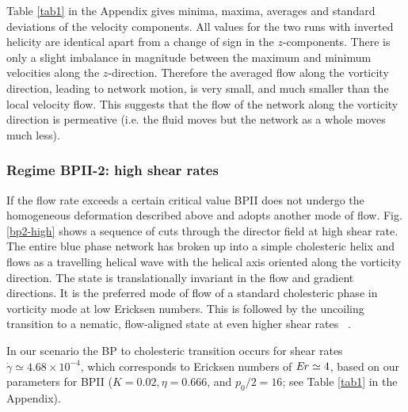 \documentclass[8.5pt,twoside,twocolumn]{article}
\newcommand{\e}[1]{\times10^{#1}}
\newcommand{\gd}{\dot{\gamma}}
\begin{document}
Table \ref{tab1} in the Appendix 
gives minima, maxima, averages and standard deviations 
of the velocity components.
All values for the two runs with inverted helicity are identical apart 
from a change of sign in the $z$-components.
There is only a slight imbalance in magnitude 
between the maximum and minimum velocities 
along the $z$-direction. Therefore the averaged flow along the vorticity
direction, leading to network motion, is very small, and much smaller than
the local velocity flow. This suggests that the
flow of the network along the vorticity 
direction is permeative (i.e. the fluid moves but the network as a whole 
moves much less). 

\subsubsection{Regime BPII-2: high shear rates }

If the flow rate exceeds a certain critical value BPII does not undergo the 
homogeneous deformation described above and adopts another mode of flow. 
Fig. \ref{bp2-high} shows a sequence of cuts through the director 
field at high shear rate. The entire blue phase network has broken up 
into a simple cholesteric helix and flows as a travelling 
helical wave with the helical axis oriented along the vorticity direction.
The state is translationally invariant in the flow and gradient directions.
It is the preferred mode of flow of a standard cholesteric phase
in vorticity mode at low Ericksen numbers. This is followed by
the uncoiling transition to a nematic, flow-aligned state at even 
higher shear rates ~\cite{Rey:1996a, Rey:1996b}.

In our scenario the BP to cholesteric transition occurs for shear rates $\gd\simeq 4.68\e{-4}$, which
corresponds to Ericksen numbers of ${\it Er}\simeq4$, based on our
parameters for BPII ($K=0.02, \eta=0.666$, and $p_0/2=16$;
see Table \ref{tab1} in the Appendix).
\end{document}
